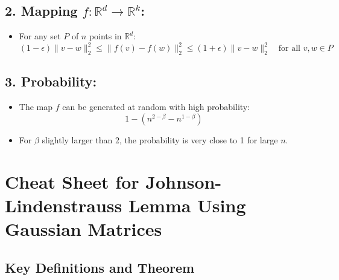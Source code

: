 \documentclass{article}
\begin{document}
\subsection*{2. Mapping $f: \mathbb{R}^d \to \mathbb{R}^k$:}
\begin{itemize}
    \item For any set $P$ of $n$ points in $\mathbb{R}^d$:
    \[
    (1 - \epsilon) \| v - w \|_2^2 \leq \| f(v) - f(w) \|_2^2 \leq (1 + \epsilon) \| v - w \|_2^2 \quad \text{for all } v, w \in P
    \]
\end{itemize}

\subsection*{3. Probability:}
\begin{itemize}
    \item The map $f$ can be generated at random with high probability:
    \[
    1 - \left( n^{2 - \beta} - n^{1 - \beta} \right)
    \]
    \item For $\beta$ slightly larger than 2, the probability is very close to 1 for large $n$.
\end{itemize}




\section*{Cheat Sheet for Johnson-Lindenstrauss Lemma Using Gaussian Matrices}

\subsection*{Key Definitions and Theorem}
\end{document}
